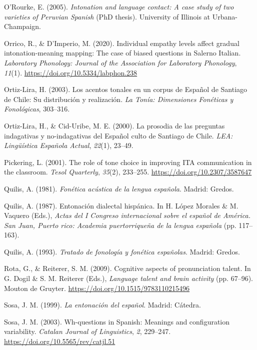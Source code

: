 \documentclass[]{article}
\newlength{\cslhangindent}
\newenvironment{CSLReferences}[2] %
 {%
  \setlength{\parindent}{0pt}
  \ifodd #1 \everypar{\setlength{\hangindent}{\cslhangindent}}\ignorespaces\fi
  \ifnum #2 > 0
  \setlength{\parskip}{#2\baselineskip}
  \fi
 }%
 {}
\begin{document}
\begin{CSLReferences}{1}{0}
\leavevmode{}%
O'Rourke, E. (2005). \emph{Intonation and language contact: {A} case study of two varieties of {P}eruvian {S}panish} (PhD thesis). {University of Illinois at Urbana-Champaign}.

\leavevmode{}%
Orrico, R., \& D'Imperio, M. (2020). Individual empathy levels affect gradual intonation-meaning mapping: The case of biased questions in {S}alerno {I}talian. \emph{Laboratory Phonology: Journal of the Association for Laboratory Phonology}, \emph{11}(1). \url{https://doi.org/10.5334/labphon.238}

\leavevmode{}%
Ortiz-Lira, H. (2003). Los acentos tonales en un corpus de {E}spañol de {Santiago de Chile}: Su distribución y realización. \emph{La Tonía: Dimensiones Fonéticas y Fonológicas}, 303--316.

\leavevmode{}%
Ortiz-Lira, H., \& Cid-Uribe, M. E. (2000). La prosodia de las preguntas indagativas y no-indagativas del {E}spañol culto de {S}antiago de {C}hile. \emph{LEA: Lingüística {E}spañola {A}ctual}, \emph{22}(1), 23--49.

\leavevmode{}%
Pickering, L. (2001). The role of tone choice in improving {ITA} communication in the classroom. \emph{Tesol Quarterly}, \emph{35}(2), 233--255. \url{https://doi.org/10.2307/3587647}

\leavevmode{}%
Quilis, A. (1981). \emph{Fon{é}tica ac{ú}stica de la lengua espa{ñ}ola}. Madrid: Gredos.

\leavevmode{}%
Quilis, A. (1987). Entonación dialectal hispánica. In H. López Morales \& M. Vaquero (Eds.), \emph{{A}ctas del {I} {C}ongreso internacional sobre el español de {A}mérica. {S}an {J}uan, {P}uerto rico: {A}cademia puertorriqueña de la lengua española} (pp. 117--163).

\leavevmode{}%
Quilis, A. (1993). \emph{Tratado de fonología y fonética españolas}. Madrid: Gredos.

\leavevmode{}%
Rota, G., \& Reiterer, S. M. (2009). Cognitive aspects of pronunciation talent. In G. Dogil \& S. M. Reiterer (Eds.), \emph{Language talent and brain activity} (pp. 67--96). Mouton de Gruyter. \url{https://doi.org/10.1515/9783110215496}

\leavevmode{}%
Sosa, J. M. (1999). \emph{La entonación del español}. Madrid: Cátedra.

\leavevmode{}%
Sosa, J. M. (2003). Wh-questions in {S}panish: Meanings and configuration variability. \emph{Catalan Journal of Linguistics}, \emph{2}, 229--247. \url{https://doi.org/10.5565/rev/catjl.51}

\end{CSLReferences}
\end{document}
